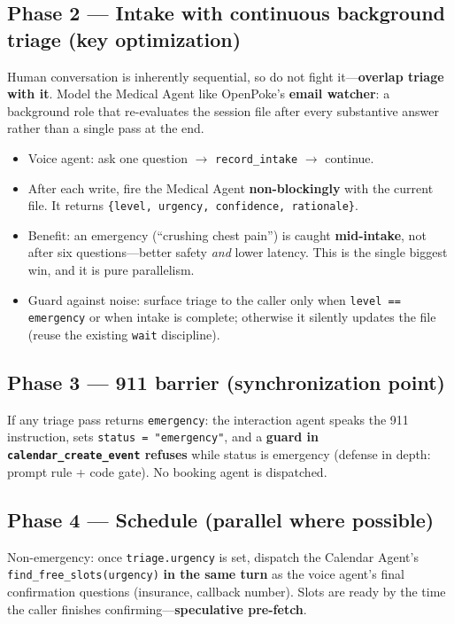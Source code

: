 \documentclass[11pt,a4paper]{article}
\begin{document}
\subsection{Phase 2 --- Intake with continuous background triage (key optimization)}
Human conversation is inherently sequential, so do not fight it---\textbf{overlap triage with it}. Model the
Medical Agent like OpenPoke's \textbf{email watcher}: a background role that re-evaluates the session file
after every substantive answer rather than a single pass at the end.

\begin{itemize}[leftmargin=*]
  \item Voice agent: ask one question $\rightarrow$ \texttt{record\_intake} $\rightarrow$ continue.
  \item After each write, fire the Medical Agent \textbf{non-blockingly} with the current file. It returns
  \texttt{\{level, urgency, confidence, rationale\}}.
  \item Benefit: an emergency (``crushing chest pain'') is caught \textbf{mid-intake}, not after six
  questions---better safety \emph{and} lower latency. This is the single biggest win, and it is pure parallelism.
  \item Guard against noise: surface triage to the caller only when \texttt{level == emergency} or when intake
  is complete; otherwise it silently updates the file (reuse the existing \texttt{wait} discipline).
\end{itemize}

\subsection{Phase 3 --- 911 barrier (synchronization point)}
If any triage pass returns \texttt{emergency}: the interaction agent speaks the 911 instruction, sets
\texttt{status = "emergency"}, and a \textbf{guard in \texttt{calendar\_create\_event} refuses} while status is
emergency (defense in depth: prompt rule + code gate). No booking agent is dispatched.

\subsection{Phase 4 --- Schedule (parallel where possible)}
Non-emergency: once \texttt{triage.urgency} is set, dispatch the Calendar Agent's
\texttt{find\_free\_slots(urgency)} \textbf{in the same turn} as the voice agent's final confirmation questions
(insurance, callback number). Slots are ready by the time the caller finishes confirming---\textbf{speculative
pre-fetch}.
\end{document}
